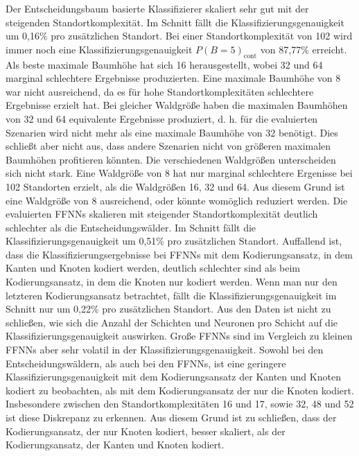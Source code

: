 \newline
\newline
Der Entscheidungsbaum basierte Klassifizierer skaliert sehr gut mit der steigenden Standortkomplexität.
Im Schnitt fällt die Klassifizierungsgenauigkeit um 0,16\% pro zusätzlichen Standort.
Bei einer Standortkomplexität von 102 wird immer noch eine Klassifizierungsgenauigkeit $P(B=5)_{\text{cont}}$ von 87,77\% erreicht.
Als beste maximale Baumhöhe hat sich 16 herausgestellt, wobei 32 und 64 marginal schlechtere Ergebnisse produzierten.
Eine maximale Baumhöhe von 8 war nicht ausreichend, da es für hohe Standortkomplexitäten schlechtere Ergebnisse erzielt hat.
Bei gleicher Waldgröße haben die maximalen Baumhöhen von 32 und 64 equivalente Ergebnisse produziert,
d. h. für die evaluierten Szenarien wird nicht mehr als eine maximale Baumhöhe von 32 benötigt.
Dies schließt aber nicht aus, dass andere Szenarien nicht von größeren maximalen Baumhöhen profitieren könnten.
Die verschiedenen Waldgrößen unterscheiden sich nicht stark.
Eine Waldgröße von 8 hat nur marginal schlechtere Ergenisse bei 102 Standorten erzielt, als die Waldgrößen 16, 32 und 64.
Aus diesem Grund ist eine Waldgröße von 8 ausreichend, oder könnte womöglich reduziert werden.
\newpage
Die evaluierten FFNNs skalieren mit steigender Standortkomplexität deutlich schlechter als die Entscheidungswälder.
Im Schnitt fällt die Klassifizierungsgenauigkeit um 0,51\% pro zusätzlichen Standort.
Auffallend ist, dass die Klassifizierungsergebnisse bei FFNNs mit dem Kodierungsansatz, in dem Kanten und Knoten kodiert werden,
deutlich schlechter sind als beim Kodierungsansatz, in dem die Knoten nur kodiert werden.
Wenn man nur den letzteren Kodierungsansatz betrachtet, fällt die Klassifizierungsgenauigkeit im Schnitt nur um 0,22\% pro zusätzlichen Standort.
Aus den Daten ist nicht zu schließen, wie sich die Anzahl der Schichten und Neuronen pro Schicht auf die Klassifizierungsgenauigkeit auswirken.
Große FFNNs sind im Vergleich zu kleinen FFNNs aber sehr volatil in der Klassifizierungsgenauigkeit.
\newline
\newline
Sowohl bei den Entscheidungswäldern, als auch bei den FFNNs, ist eine geringere Klassifizierungsgenauigkeit mit dem Kodierungsansatz der Kanten und Knoten kodiert
zu beobachten, als mit dem Kodierungsansatz der nur die Knoten kodiert.
Insbesondere zwischen den Standortkomplexitäten 16 und 17, sowie 32, 48 und 52 ist diese Diskrepanz zu erkennen.
Aus diesem Grund ist zu schließen, dass der Kodierungsansatz, der nur Knoten kodiert, besser skaliert, als der Kodierungsansatz, der Kanten und Knoten kodiert.